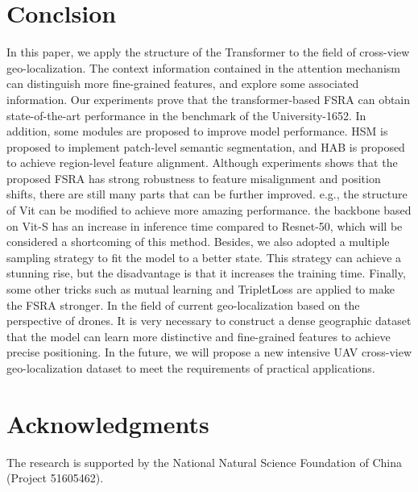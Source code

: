 \documentclass[lettersize,journal]{IEEEtran}
\begin{document}
\section{Conclsion}
In this paper, we apply the structure of the Transformer to the field of cross-view geo-localization. The context information contained in the attention mechanism can distinguish more fine-grained features, and explore some associated information. Our experiments prove that the transformer-based FSRA can obtain state-of-the-art performance in the benchmark of the University-1652. In addition, some modules are proposed to improve model performance. HSM is proposed to implement patch-level semantic segmentation, and HAB is proposed to achieve region-level feature alignment. Although experiments shows that the proposed FSRA has strong robustness to feature misalignment and position shifts, there are still many parts that can be further improved. e.g., the structure of Vit can be modified to achieve more amazing performance. the backbone based on Vit-S has an increase in inference time compared to Resnet-50, which will be considered a shortcoming of this method. Besides, we also adopted a multiple sampling strategy to fit the model to a better state. This strategy can achieve a stunning rise, but the disadvantage is that it increases the training time. Finally, some other tricks such as mutual learning and TripletLoss are applied to make the FSRA stronger.
In the field of current geo-localization based on the perspective of drones. It is very necessary to construct a dense geographic dataset that the model can learn more distinctive and fine-grained features to achieve precise positioning. In the future, we will propose a new intensive UAV cross-view geo-localization dataset to meet the requirements of practical applications.


\section*{Acknowledgments}
The research is supported by the National Natural Science Foundation of China (Project 51605462).
\end{document}
